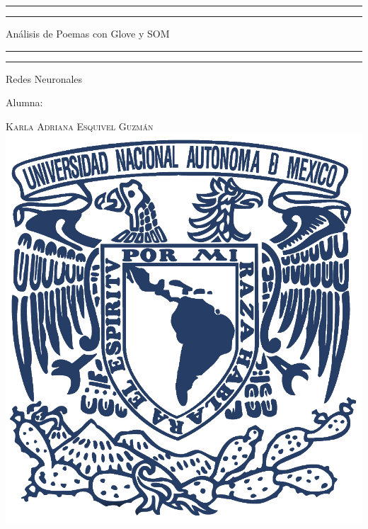 \documentclass[a4paper, 11pt, oneside]{article}
\begin{document}
 

\begin{titlepage} 

	\centering 
	
	\scshape 
	
	\vspace*{\baselineskip} 
	
	
	
	\rule{\textwidth}{1.6pt}\vspace*{-\baselineskip}\vspace*{2pt} 
	\rule{\textwidth}{0.4pt} 
	
	\vspace{0.75\baselineskip} 
	
	{\LARGE Análisis de Poemas con Glove y SOM}	
	\vspace{0.75\baselineskip} 
	
	\rule{\textwidth}{0.4pt}\vspace*{-\baselineskip}\vspace{3.2pt}
	\rule{\textwidth}{1.6pt} 
	
	\vspace{2\baselineskip} 
	

	Redes Neuronales
	
	\vspace*{3\baselineskip} 
	
	
	
	Alumna:
	
	\vspace{0.5\baselineskip} 
	
	{\scshape\Large Karla Adriana Esquivel Guzmán}
	\vspace{0.5\baselineskip} 
	\vfill
	\includegraphics[scale=0.65]{unam.jpg}
	

\end{titlepage}
\end{document}
